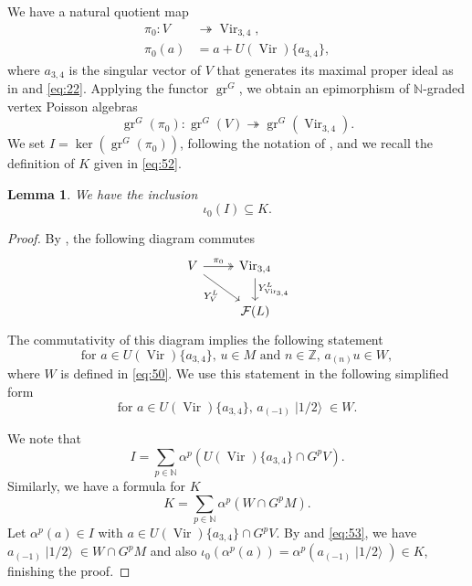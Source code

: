 \documentclass[a4paper, 12pt, reqno]{amsart}
\newtheorem{lemma}[theorem]{Lemma}
\theoremstyle{remark}
\DeclareMathOperator{\Vir}{Vir}
\DeclareMathOperator{\gr}{gr}
\DeclareMathOperator{\vachalf}{|1/2\rangle}
\begin{document}
We have a natural quotient map
\begin{align*}
  \pi_0: V &\twoheadrightarrow \Vir_{3, 4}, \\
  \pi_0(a) &= a + U(\Vir)\{a_{3, 4}\},
\end{align*}
where $a_{3, 4}$ is the singular vector of $V$ that generates its maximal proper ideal as in \cite{andrews_singular_2022} and \eqref{eq:22}.
Applying the functor $\gr^G$, we obtain an epimorphism of $\mathbb{N}$-graded vertex Poisson algebras
\begin{equation*}
  \gr^G(\pi_0): \gr^G(V) \twoheadrightarrow \gr^G(\Vir_{3, 4}).
\end{equation*}
We set $I = \ker(\gr^G(\pi_0))$, following the notation of \cite{andrews_singular_2022}, and we recall the definition of $K$ given in \eqref{eq:52}.

\begin{lemma}
  \label{lmm:37}
  We have the inclusion
  \begin{equation*}
    \iota_0(I) \subseteq K.
  \end{equation*}
\end{lemma}

\begin{proof}
  By , the following diagram commutes
  \begin{equation*}
    \begin{tikzcd}
      V \arrow[r, "\pi_0", two heads] \arrow[rd, "{Y^L_{V}}"'] & {\Vir_{3, 4}} \arrow[d, "{Y^L_{\Vir_{3, 4}}}"] \\
      & {\mathcal{F}(L)}
    \end{tikzcd}
  \end{equation*}
  The commutativity of this diagram implies the following statement
  \begin{equation*}
    \text{for $a \in U(\Vir)\{a_{3, 4}\}$, $u \in M$ and $n \in \mathbb{Z}$, $a_{(n)}u \in W$},
  \end{equation*}
  where $W$ is defined in \eqref{eq:50}.
  We use this statement in the following simplified form
  \begin{equation}
    \label{eq:53}
    \text{for $a \in U(\Vir)\{a_{3, 4}\}$, $a_{(-1)}\vachalf \in W$}.
  \end{equation}

  We note that
  \begin{equation*}
    I = \sum_{p \in \mathbb{N}}\alpha^p(U(\Vir)\{a_{3, 4}\} \cap G^pV).
  \end{equation*}
  Similarly, we have a formula for $K$
  \begin{equation*}
    K = \sum_{p \in \mathbb{N}}\alpha^p(W \cap G^pM).
  \end{equation*}
  Let $\alpha^p(a) \in I$ with $a \in U(\Vir)\{a_{3, 4}\} \cap G^pV$.
  By  and \eqref{eq:53}, we have $a_{(-1)}\vachalf \in W \cap G^pM$ and also $\iota_0(\alpha^p(a)) = \alpha^p(a_{(-1)}\vachalf) \in K$, finishing the proof.
\end{proof}
\end{document}
